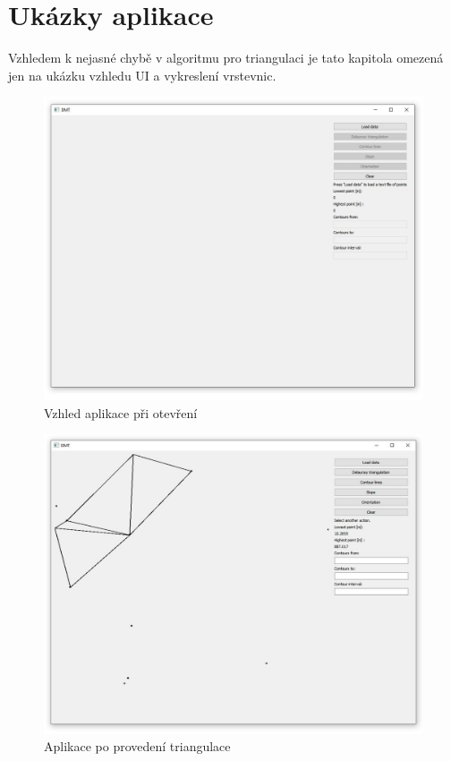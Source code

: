 \documentclass{article}
\begin{document}
\section{Ukázky aplikace} %
\indent Vzhledem k nejasné chybě v algoritmu pro triangulaci je tato kapitola omezená jen na ukázku vzhledu UI a vykreslení vrstevnic. \\
\begin{figure}[htbp]
\centering
        \includegraphics[trim=0cm 0cm 0cm 0cm, width=1\textwidth]{startup.jpg}
        \caption{Vzhled aplikace při otevření}
\end{figure}

\begin{figure}[htbp]
\centering
        \includegraphics[trim=0cm 0cm 0cm 0cm, width=1\textwidth]{triangulate.jpg}
        \caption{Aplikace po provedení triangulace}
\end{figure}
\end{document}
